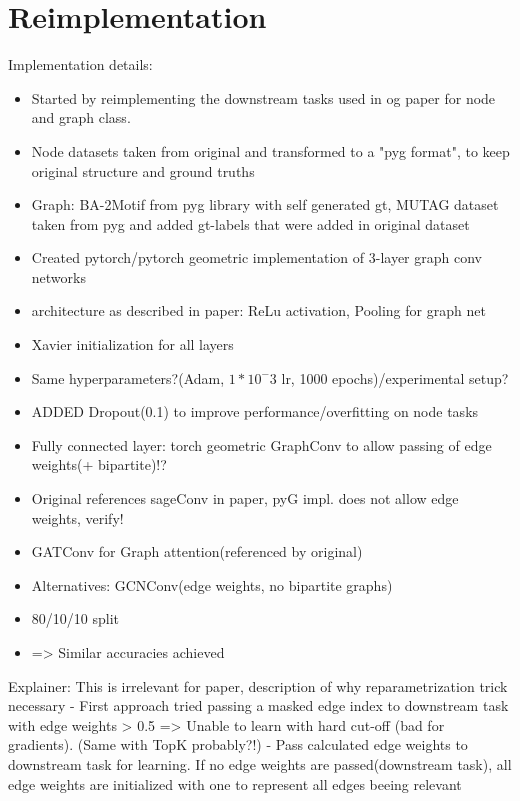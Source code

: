 \section{Reimplementation}
Implementation details:
\begin{itemize}
    \item Started by reimplementing the downstream tasks used in og paper for node and graph class.
    \item Node datasets taken from original and transformed to a "pyg format", to keep original structure and ground truths
    \item Graph: BA-2Motif from pyg library with self generated gt, MUTAG dataset taken from pyg and added gt-labels that were added in original dataset
    \item Created pytorch/pytorch geometric implementation of 3-layer graph conv networks
    \item architecture as described in paper: ReLu activation, Pooling for graph net
    \item Xavier initialization for all layers
    \item Same hyperparameters?(Adam, $1*10^-3$ lr, 1000 epochs)/experimental setup?
    \item ADDED Dropout(0.1) to improve performance/overfitting on node tasks
    \item Fully connected layer: torch geometric GraphConv to allow passing of edge weights(+ bipartite)!?
    \item Original references sageConv in paper, pyG impl. does not allow edge weights, verify!
    \item GATConv for Graph attention(referenced by original)
    \item Alternatives: GCNConv(edge weights, no bipartite graphs)
    \item 80/10/10 split
    \item => Similar accuracies achieved
\end{itemize}
 

 Explainer:
 This is irrelevant for paper, description of why reparametrization trick necessary
 - First approach tried passing a masked edge index to downstream task with edge weights > 0.5
 => Unable to learn with hard cut-off (bad for gradients). (Same with TopK probably?!)
 - Pass calculated edge weights to downstream task for learning. If no edge weights are passed(downstream task), all edge weights are initialized with one to represent all edges beeing relevant
 

